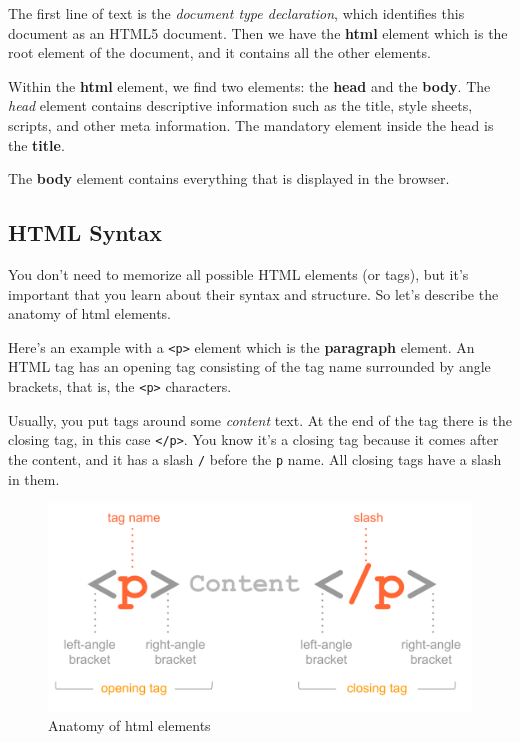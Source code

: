 \documentclass[
]{book}
\begin{document}
The first line of text is the \emph{document type declaration}, which identifies
this document as an HTML5 document.
Then we have the \textbf{html} element which is the root element of the document,
and it contains all the other elements.

Within the \textbf{html} element, we find two elements: the \textbf{head} and the
\textbf{body}. The \emph{head} element contains descriptive information such as the
title, style sheets, scripts, and other meta information. The mandatory element
inside the head is the \textbf{title}.

The \textbf{body} element contains everything that is displayed in the browser.

\hypertarget{html-syntax}{%
\subsection{HTML Syntax}\label{html-syntax}}

You don't need to memorize all possible HTML elements (or tags), but it's
important that you learn about their syntax and structure. So let's describe
the anatomy of html elements.

Here's an example with a \texttt{\textless{}p\textgreater{}} element which is the \textbf{paragraph} element.
An HTML tag has an opening tag consisting of the tag name surrounded by angle
brackets, that is, the \texttt{\textless{}p\textgreater{}} characters.

Usually, you put tags around some \emph{content} text. At the end of the tag there
is the closing tag, in this case \texttt{\textless{}/p\textgreater{}}. You know it's a closing tag because
it comes after the content, and it has a slash \texttt{/} before the \texttt{p} name. All
closing tags have a slash in them.

\begin{figure}

{\centering \includegraphics[width=0.7\linewidth]{images/html/html-syntax1} 

}

\caption{Anatomy of html elements}\label{fig:unnamed-chunk-78}
\end{figure}
\end{document}
